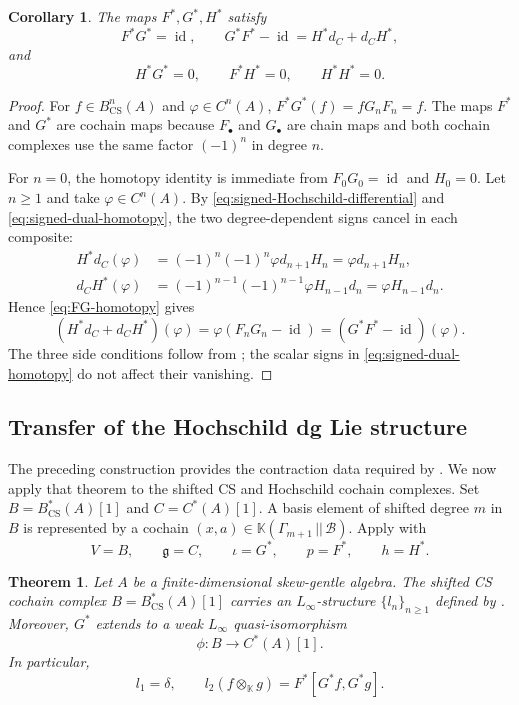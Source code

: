 \documentclass[11pt,a4paper,reqno]{amsart}
\newcommand{\mK}{\mathbb K}
\newcommand{\mB}{\mathcal B}
\newcommand{\id}{\operatorname{id}}
\newcommand{\para}[2]{(#1,#2)}
\newcommand{\Para}[2]{(#1\,||\,#2)}
\theoremstyle{plain}
\newtheorem{theorem}{Theorem}[section]
\newtheorem{corollary}[corollary]{Corollary}
\theoremstyle{definition}
\numberwithin{equation}{section}
\begin{document}
	\begin{corollary}\label{cor:dual-contraction}
		The maps $F^*,G^*,H^*$ satisfy
		\[
		F^*G^*=\id,\qquad
		G^*F^*-\id=H^*d_C+d_CH^*,
		\]
		and
		\[
		H^*G^*=0,\qquad
		F^*H^*=0,\qquad
		H^*H^*=0.
		\]
	\end{corollary}
	
	\begin{proof}
		For $f\in B_{\mathrm{CS}}^n(A)$ and $\varphi\in C^n(A)$,
		$F^*G^*(f)=fG_nF_n=f$.
		The maps $F^*$ and $G^*$ are cochain maps because $F_\bullet$ and
		$G_\bullet$ are chain maps and both cochain complexes use the same factor
		$(-1)^n$ in degree $n$.
		
		For $n=0$, the homotopy identity is immediate from $F_0G_0=\id$ and
		$H_0=0$.  Let $n\geq1$ and take $\varphi\in C^n(A)$.  By
		\eqref{eq:signed-Hochschild-differential} and
		\eqref{eq:signed-dual-homotopy}, the two degree-dependent signs cancel in
		each composite:
		\begin{align*}
			H^*d_C(\varphi)
			&=
			(-1)^n(-1)^n\varphi d_{n+1}H_n
			=
			\varphi d_{n+1}H_n,
			\\
			d_CH^*(\varphi)
			&=
			(-1)^{n-1}(-1)^{n-1}\varphi H_{n-1}d_n
			=
			\varphi H_{n-1}d_n.
		\end{align*}
		Hence \eqref{eq:FG-homotopy} gives
		\[
		(H^*d_C+d_CH^*)(\varphi)
		=
		\varphi(F_nG_n-\id)
		=
		(G^*F^*-\id)(\varphi).
		\]
		The three side conditions follow from
		; the scalar signs in
		\eqref{eq:signed-dual-homotopy} do not affect their vanishing.
	\end{proof}
	
	\subsection{Transfer of the Hochschild dg Lie structure}
	\label{subsec:transfer-Hochschild}
	
	The preceding construction provides the contraction data required by
	.  We now apply that theorem to the shifted CS and
	Hochschild cochain complexes.  Set $B=B_{\mathrm{CS}}^*(A)[1]$ and
	$C=C^*(A)[1]$.
	A basis element of shifted degree $m$ in $B$ is represented by a cochain
	$\para{x}{a}\in\mK\Para{\Gamma_{m+1}}{\mB}$.
	Apply  with
	\[
	V=B,\qquad \mathfrak g=C,\qquad \iota=G^*,\qquad p=F^*,\qquad h=H^*.
	\]
	
	\begin{theorem}\label{thm:transferred-Linfty}
		Let $A$ be a finite-dimensional skew-gentle algebra.  The shifted CS cochain
		complex $B=B_{\mathrm{CS}}^*(A)[1]$ carries an $L_\infty$-structure
		$\{l_n\}_{n\geq1}$ defined by
		.  Moreover, $G^*$
		extends to a weak $L_\infty$ quasi-isomorphism
		\[
		\phi:B\longrightarrow C^*(A)[1].
		\]
		In particular,
		\[
		l_1=\delta,\qquad
		l_2(f\otimes_{\mK}g)=F^*[G^*f,G^*g].
		\]
	\end{theorem}
	
\end{document}
